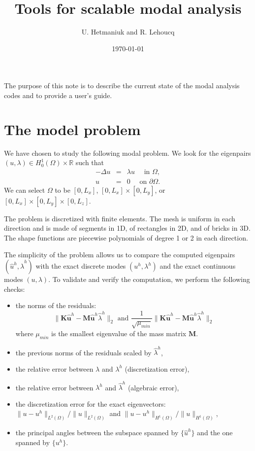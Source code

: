 \documentclass[11pt]{article}
\providecommand{\norm}[1]{\lVert#1\rVert}
\newcommand{\R}{\mathbb{R}}
\newcommand{\K}{\mathbf{K}}
\newcommand{\M}{\mathbf{M}}
\begin{document}
\title{Tools for scalable modal analysis}\author{U. Hetmaniuk and R. Lehoucq}\date{\today}\maketitle

The purpose of this note is to describe the current state of the modal analysis
codes and to provide a user's guide.

\section{The model problem}

We have chosen to study the following  modal problem.
We look for the eigenpairs $(u, \lambda) \in H^{1}_{0}(\Omega) \times \R$ such that
\begin{eqnarray*}-\Delta u & = & \lambda u \quad \mbox{ in } \Omega, \\
u & = & 0 \quad \mbox{ on } \partial \Omega.\end{eqnarray*}We can select $\Omega$ to be $[0, L_x]$, $[0, L_x] \times [0, L_y]$, or
$[0, L_x] \times [0, L_y] \times [0, L_z]$.

The problem is discretized with finite elements.
The mesh is uniform in each direction and is made of segments in 1D, 
of rectangles in 2D, and of bricks in 3D.
The shape functions are piecewise polynomials of degree 1 or 2
in each direction.

The simplicity of the problem allows us to compare the computed
eigenpairs $(\hat{u}^h, \hat{\lambda}^h)$ with the exact 
discrete modes $(u^h, \lambda^h)$ and the exact 
continuous modes $(u, \lambda)$.
To validate and verify the computation, we perform the following checks:
\begin{itemize}
\item the norms of the residuals: 
$$
\norm{ \K \mathbf{\hat{u}}^h - \M \mathbf{\hat{u}}^h \hat{\lambda}^h }_{2}
\mbox{ and }
\frac{1}{ \sqrt{\mu_{min}}} 
 \norm{ \K \mathbf{\hat{u}}^h - \M \mathbf{\hat{u}}^h \hat{\lambda}^h }_{2}
$$
where $\mu_{min}$ is the smallest eigenvalue of the mass matrix $\M$.
\item the previous norms of the residuals scaled by $\hat{\lambda}^h$,
\item the relative error between $\lambda$ and $\lambda^h$ (discretization error),
\item the relative error between $\lambda^h$ and $\hat{\lambda}^h$ (algebraic error),
\item the discretization error for the exact eigenvectors:
$\norm{ u - u^h}_{L^2(\Omega)} / \norm{u}_{L^2(\Omega)}$ and 
$\norm{ u - u^h}_{H^1(\Omega)} / \norm{u}_{H^1(\Omega)}$,
\item the principal angles between the subspace spanned by $\{ \hat{u}^h \}$
and the one spanned by  $\{ u^h \}$.
\end{itemize}
\end{document}
